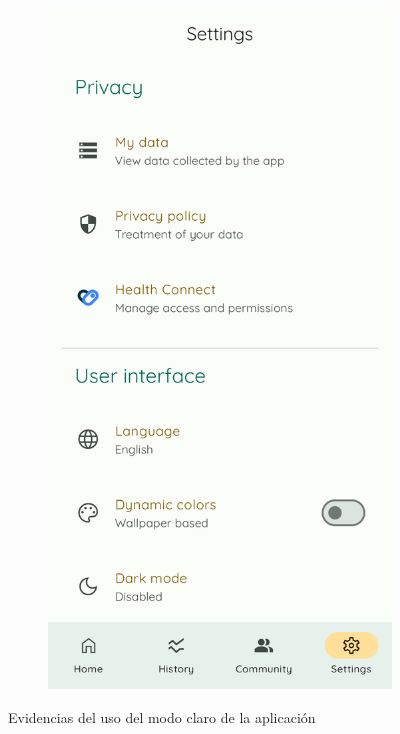 \begin{figure}[htbp]
\begin{subfigure}[c]{0.4\textwidth}
                \end{subfigure}
                \hspace{0.1\textwidth}
                \begin{subfigure}[c]{0.4\textwidth}
                    \centering
                    \includegraphics[width=1\linewidth]{figures/pruebas/modo_claro/Despues.png}
                \end{subfigure}
                \caption{Evidencias del uso del modo claro de la aplicación}
                \label{figure:pruebas:modo_claro}
            \end{figure}
            

